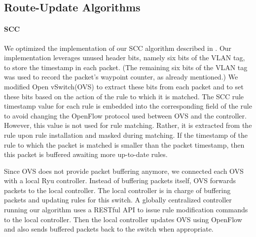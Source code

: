 \subsection{Route-Update Algorithms}
\label{sec:implementation:route}

\paragraph{SCC}

We optimized the implementation of our SCC algorithm described in .
Our implementation leverages unused header bits, namely six bits of
the VLAN tag, to store the timestamp in each packet.  (The remaining
six bits of the VLAN tag was used to record the packet's waypoint
counter, as already mentioned.)  We
modified Open vSwitch(OVS) to extract these bits from each packet and
to set these bits based on the action of the rule to which it is
matched. The SCC rule timestamp value for each rule  is
embedded into the corresponding field of the rule to avoid changing
the OpenFlow protocol used between OVS and the controller. However,
this value is not used for rule matching.  Rather, it is extracted
from the rule upon rule installation and masked during matching. If
the timestamp of the rule to which the packet is matched is smaller
than the packet timestamp, then this packet is buffered awaiting
more up-to-date rules.

Since OVS does not provide packet buffering anymore, we connected each
OVS with a local Ryu controller. Instead of buffering packets itself,
OVS forwards packets to the local controller. The local controller
is in charge of buffering packets and updating rules for this
switch. A globally centralized controller running our algorithm uses a
RESTful API to issue rule modification commands to the local
controller. Then the local controller updates OVS using OpenFlow and
also sends buffered packets back to the switch when appropriate.


